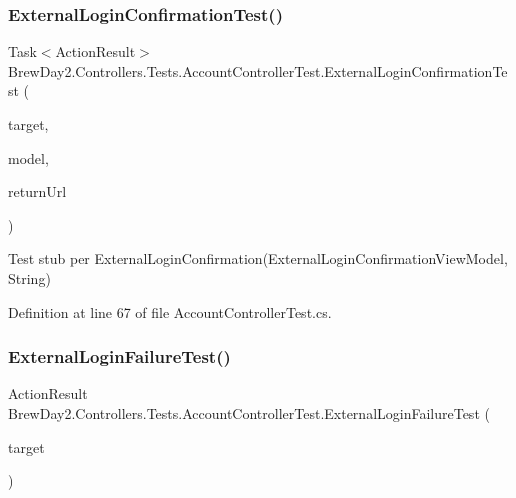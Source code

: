 \subsubsection{\texorpdfstring{External\+Login\+Confirmation\+Test()}{ExternalLoginConfirmationTest()}}
{\footnotesize\ttfamily Task$<$Action\+Result$>$ Brew\+Day2.\+Controllers.\+Tests.\+Account\+Controller\+Test.\+External\+Login\+Confirmation\+Test (\begin{DoxyParamCaption}\item[{\mbox{[}\+Pex\+Assume\+Under\+Test\mbox{]} \mbox{\hyperlink{class_brew_day2_1_1_controllers_1_1_account_controller}{Account\+Controller}}}]{target,  }\item[{\mbox{\hyperlink{class_brew_day2_1_1_models_1_1_external_login_confirmation_view_model}{External\+Login\+Confirmation\+View\+Model}}}]{model,  }\item[{string}]{return\+Url }\end{DoxyParamCaption})}



Test stub per External\+Login\+Confirmation(\+External\+Login\+Confirmation\+View\+Model, String)



Definition at line 67 of file Account\+Controller\+Test.\+cs.

\mbox{\label{class_brew_day2_1_1_controllers_1_1_tests_1_1_account_controller_test_a793113ce1e8d0ccb05f472573a69b608}} 
\subsubsection{\texorpdfstring{External\+Login\+Failure\+Test()}{ExternalLoginFailureTest()}}
{\footnotesize\ttfamily Action\+Result Brew\+Day2.\+Controllers.\+Tests.\+Account\+Controller\+Test.\+External\+Login\+Failure\+Test (\begin{DoxyParamCaption}\item[{\mbox{[}\+Pex\+Assume\+Under\+Test\mbox{]} \mbox{\hyperlink{class_brew_day2_1_1_controllers_1_1_account_controller}{Account\+Controller}}}]{target }\end{DoxyParamCaption})}




